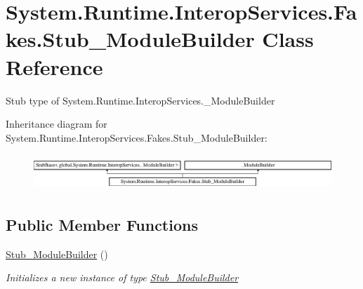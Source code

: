 \hypertarget{class_system_1_1_runtime_1_1_interop_services_1_1_fakes_1_1_stub___module_builder}{\section{System.\-Runtime.\-Interop\-Services.\-Fakes.\-Stub\-\_\-\-Module\-Builder Class Reference}
\label{class_system_1_1_runtime_1_1_interop_services_1_1_fakes_1_1_stub___module_builder}
}


Stub type of System.\-Runtime.\-Interop\-Services.\-\_\-\-Module\-Builder 


Inheritance diagram for System.\-Runtime.\-Interop\-Services.\-Fakes.\-Stub\-\_\-\-Module\-Builder\-:\begin{figure}[H]
\begin{center}
\leavevmode
\includegraphics[height=1.369193cm]{class_system_1_1_runtime_1_1_interop_services_1_1_fakes_1_1_stub___module_builder}
\end{center}
\end{figure}
\subsection*{Public Member Functions}
\begin{DoxyCompactItemize}
\item 
\hyperlink{class_system_1_1_runtime_1_1_interop_services_1_1_fakes_1_1_stub___module_builder_a31cee3bed5b462185b70b356f17418c0}{Stub\-\_\-\-Module\-Builder} ()
\begin{DoxyCompactList}\small\item\em Initializes a new instance of type \hyperlink{class_system_1_1_runtime_1_1_interop_services_1_1_fakes_1_1_stub___module_builder}{Stub\-\_\-\-Module\-Builder}\end{DoxyCompactList}\end{DoxyCompactItemize}

